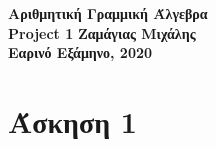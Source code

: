 \documentclass[a4paper,12pt]{article}
\begin{document}
\begin{titlepage}
    \begin{center}
        \vspace*{\fill}
        \huge{\textbf{Αριθμητική Γραμμική Άλγεβρα\\}}
        \vfill
        \huge{\textbf{Project 1}}
        \vspace*{\fill}
        \vfill
        \normalsize\textbf{Ζαμάγιας Μιχάλης\\}
        \small\textbf{Εαρινό Εξάμηνο, 2020\\}
        \vfill
    \end{center}
\end{titlepage}
\section{Άσκηση 1}
\end{document}
